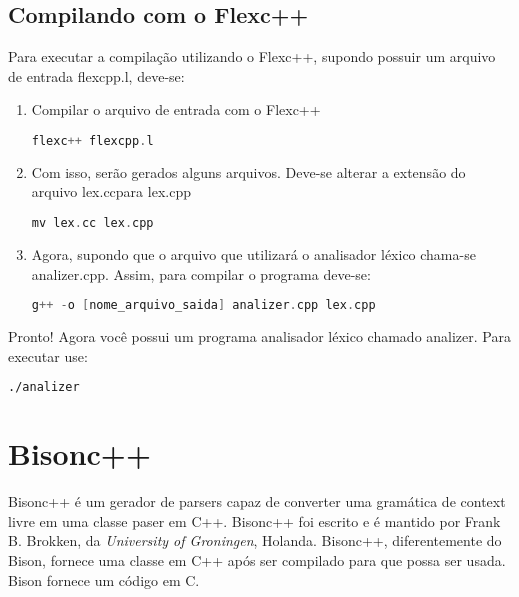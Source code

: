 \begin{apendicesenv}
\subsection{Compilando com o Flexc++}

Para executar a compilação utilizando o Flexc++, supondo possuir um arquivo de entrada flexcpp.l, deve-se:
\begin{enumerate}
\item Compilar o arquivo de entrada com o Flexc++


\begin{lstlisting}[language=c, label=apendiceCodigoFlex5, caption=Comando para Compilar Flexc++]
 flexc++ flexcpp.l
\end{lstlisting}

\item Com isso, serão gerados alguns arquivos. Deve-se alterar a extensão do arquivo lex.ccpara lex.cpp

\begin{lstlisting}[language=c, label=apendiceCodigoFlex6, caption=Comando para Alterar Extensão dos Arquivos]
mv lex.cc lex.cpp
\end{lstlisting}

\item Agora, supondo que o arquivo que utilizará o analisador léxico chama-se analizer.cpp. Assim, para compilar o programa deve-se:

\begin{lstlisting}[language=c, label=apendiceCodigoFlex7, caption=Compilar o Programa]
g++ -o [nome_arquivo_saida] analizer.cpp lex.cpp
\end{lstlisting}
\end{enumerate}

\par 
\indent Pronto! Agora você possui um programa analisador léxico chamado analizer. Para executar use:
\begin{lstlisting}[language=make, label=apendiceCodigoFlex8, caption=Executanto o Programa]
./analizer
\end{lstlisting}

\section{ Bisonc++}

Bisonc++ é um gerador de parsers capaz de converter uma gramática de context livre em uma classe paser em C++. Bisonc++ foi escrito e é mantido por Frank B. Brokken, da \textit{University of Groningen}, Holanda. Bisonc++, diferentemente do Bison, fornece uma classe em C++ após ser compilado para que possa ser usada. Bison fornece um código em C.


\end{apendicesenv}
